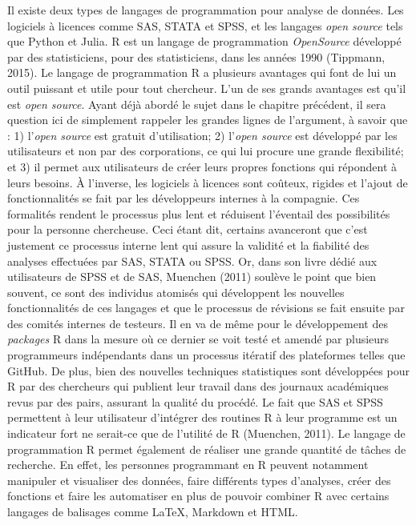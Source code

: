 \documentclass[
  letterpaper,
  DIV=11,
  numbers=noendperiod]{scrreprt}
\begin{document}
Il existe deux types de langages de programmation pour analyse de
données. Les logiciels à licences comme SAS, STATA et SPSS, et les
langages \emph{open source} tels que Python et Julia. R est un langage
de programmation \emph{OpenSource} développé par des statisticiens, pour
des statisticiens, dans les années 1990 (Tippmann, 2015). Le langage de
programmation R a plusieurs avantages qui font de lui un outil puissant
et utile pour tout chercheur. L'un de ses grands avantages est qu'il est
\emph{open source}. Ayant déjà abordé le sujet dans le chapitre
précédent, il sera question ici de simplement rappeler les grandes
lignes de l'argument, à savoir que : 1) l'\emph{open source} est gratuit
d'utilisation; 2) l'\emph{open source} est développé par les
utilisateurs et non par des corporations, ce qui lui procure une grande
flexibilité; et 3) il permet aux utilisateurs de créer leurs propres
fonctions qui répondent à leurs besoins. À l'inverse, les logiciels à
licences sont coûteux, rigides et l'ajout de fonctionnalités se fait par
les développeurs internes à la compagnie. Ces formalités rendent le
processus plus lent et réduisent l'éventail des possibilités pour la
personne chercheuse. Ceci étant dit, certains avanceront que c'est
justement ce processus interne lent qui assure la validité et la
fiabilité des analyses effectuées par SAS, STATA ou SPSS. Or, dans son
livre dédié aux utilisateurs de SPSS et de SAS, Muenchen (2011) soulève
le point que bien souvent, ce sont des individus atomisés qui
développent les nouvelles fonctionnalités de ces langages et que le
processus de révisions se fait ensuite par des comités internes de
testeurs. Il en va de même pour le développement des \emph{packages} R
dans la mesure où ce dernier se voit testé et amendé par plusieurs
programmeurs indépendants dans un processus itératif des plateformes
telles que GitHub. De plus, bien des nouvelles techniques statistiques
sont développées pour R par des chercheurs qui publient leur travail
dans des journaux académiques revus par des pairs, assurant la qualité
du procédé. Le fait que SAS et SPSS permettent à leur utilisateur
d'intégrer des routines R à leur programme est un indicateur fort ne
serait-ce que de l'utilité de R (Muenchen, 2011). Le langage de
programmation R permet également de réaliser une grande quantité de
tâches de recherche. En effet, les personnes programmant en R peuvent
notamment manipuler et visualiser des données, faire différents types
d'analyses, créer des fonctions et faire les automatiser en plus de
pouvoir combiner R avec certains langages de balisages comme LaTeX,
Markdown et HTML.
\end{document}
